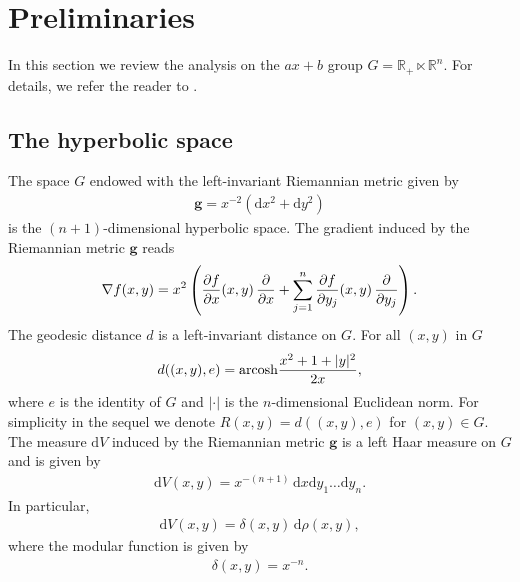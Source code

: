 \documentclass[a4paper,12pt]{amsart}
\numberwithin{equation}{section}
\theoremstyle{definition}
\theoremstyle{remark}
\numberwithin{theorem}{section}
\newcommand{\R}{\mathbb{R}}
\newcommand{\arcosh}{\mathrm{arcosh}}
\newcommand{\dV}{\mathrm{d}V}
\newcommand{\g}{\mathbf{g}}
\renewcommand{\d}{\mathrm{d}}
\begin{document}


\section{Preliminaries}\label{sec2}
In this section we review the analysis on the $ax+b$ group $G=\R_+\ltimes \R^n$. For details, we refer the reader to \cite{Br, Da, Gr, Pe2, Va}.
\smallskip


\subsection{The hyperbolic space}
The space $G$ endowed with the left-invariant Riemannian metric given by
\begin{align}\label{riem}
\g=x^{-2}(\d x^2+\d y^2)
\end{align}
is the $(n+1)$-dimensional hyperbolic space. The gradient induced by the Riemannian metric $\g$ reads
\begin{align}\label{e2.1}
\nabla f(x,y)=x^2\left({\partial f\over \partial x}(x,y)\,{\partial\over \partial x}+ \sum_{j=1}^n{\partial f\over \partial y_j}(x,y)\,{\partial \over \partial y_j}\right).
\end{align}
The geodesic distance $d$ is a left-invariant distance on $G$. For all $(x,y)$ in $G$
\begin{align}\label{e2.2}
d((x,y),e)=\arcosh{x^2+1+|y|^2\over 2x},
\end{align}
where $e$ is the identity of $G$ and $|\cdot|$ is the $n$-dimensional Euclidean norm. For simplicity in the sequel we denote $R(x,y)=d((x,y),e)$ for $(x,y)\in G$. The measure $\dV$ induced by the Riemannian metric $\g$ is a left Haar measure on $G$ and is given by
\begin{align*}
\dV(x,y)=x^{-(n+1)}\,\d x\d y_1\dots\d y_n.
\end{align*}
In particular,
\begin{align}\label{e2.4}
\dV (x,y)=\delta(x,y)\,\d \rho(x,y),
\end{align}
where the modular function is given by 
\begin{eqnarray}\label{mm}
\delta(x,y)=x^{-n}.
\end{eqnarray}
\end{document}
